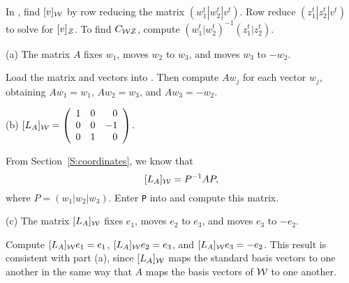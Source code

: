 \documentclass{ximera}
\begin{document}
\soln In \Matlabp, find $[v]_{\cal W}$ by row reducing
the matrix $(w_1^t|w_2^t | v^t)$.  Row reduce 
$(z_1^t|z_2^t | v^t)$ to solve for $[v]_{\cal Z}$.  To find
$C_{\cal WZ}$, compute $(w_1^t|w_2^t)^{-1}(z_1^t|z_2^t)$.

(a) \ans The matrix $A$ fixes $w_1$, moves $w_2$ to $w_3$, and moves
$w_3$ to $-w_2$.

\soln Load the matrix and vectors into \Matlabp.  Then compute $Aw_j$ for
each vector $w_j$, obtaining $Aw_1 = w_1$, $Aw_2 = w_3$, and $Aw_3 = -w_2$.

(b) \ans $[L_A]_{\cal W} = \left(\begin{array}{rrr} 1 & 0 & 0 \\ 0 & 0 & -1 \\ 0 & 1 & 0\end{array}\right)$.

\soln From Section~\ref{S:coordinates}, we know that
\[
[L_A]_{\cal W} = P^{-1}AP,
\]
where $P = (w_1|w_2|w_3)$.  Enter {\tt P} into \Matlab and compute this
matrix.

(c) \ans The matrix $[L_A]_{\cal W}$ fixes $e_1$, moves $e_2$ to
$e_3$, and moves $e_3$ to $-e_2$.

\soln Compute $[L_A]_{\cal W}e_1 = e_1$, $[L_A]_{\cal W}e_2 = e_3$, and
$[L_A]_{\cal W}e_3 = -e_2$.  This result is consistent with part (a),
since $[L_A]_{\cal W}$ maps the standard basis vectors to one another
in the same way that $A$ maps the basis vectors of ${\cal W}$ to one
another.
\end{document}
